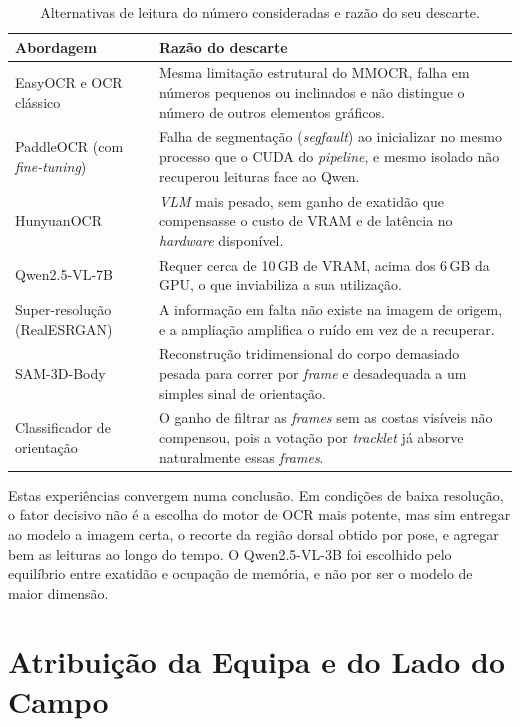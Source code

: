 \begin{table}[htbp]
\centering
\caption{Alternativas de leitura do número consideradas e razão do seu descarte.}
\label{tab:alternativas}
\renewcommand{\arraystretch}{1.35}
\setlength{\tabcolsep}{6pt}
\begin{tabular}{|p{3.6cm}|p{9.0cm}|}
\hline
\textbf{Abordagem} & \textbf{Razão do descarte} \\
\hline
EasyOCR e OCR clássico &
Mesma limitação estrutural do MMOCR, falha em números pequenos ou inclinados e não
distingue o número de outros elementos gráficos. \\
\hline
PaddleOCR (com \emph{fine-tuning}) &
Falha de segmentação (\emph{segfault}) ao inicializar no mesmo processo que o CUDA do
\emph{pipeline}, e mesmo isolado não recuperou leituras face ao Qwen. \\
\hline
HunyuanOCR &
\emph{VLM} mais pesado, sem ganho de exatidão que compensasse o custo de VRAM e de
latência no \emph{hardware} disponível. \\
\hline
Qwen2.5-VL-7B &
Requer cerca de 10\,GB de VRAM, acima dos 6\,GB da GPU, o que inviabiliza a sua
utilização. \\
\hline
Super-resolução (\mbox{RealESRGAN}) &
A informação em falta não existe na imagem de origem, e a ampliação amplifica o ruído
em vez de a recuperar. \\
\hline
SAM-3D-Body &
Reconstrução tridimensional do corpo demasiado pesada para correr por \emph{frame} e
desadequada a um simples sinal de orientação. \\
\hline
Classificador de orientação &
O ganho de filtrar as \emph{frames} sem as costas visíveis não compensou, pois a votação
por \emph{tracklet} já absorve naturalmente essas \emph{frames}. \\
\hline
\end{tabular}
\end{table}


Estas experiências convergem numa conclusão. Em condições de baixa resolução, o fator decisivo não é a escolha do motor de OCR mais potente, mas sim entregar ao modelo a imagem certa, o recorte da região dorsal obtido por pose, e agregar bem as leituras ao longo do tempo. O Qwen2.5-VL-3B foi escolhido pelo equilíbrio entre exatidão e ocupação de memória, e não por ser o modelo de maior dimensão.

\section{Atribuição da Equipa e do Lado do Campo}\label{sec:met-equipa}

